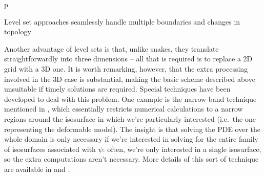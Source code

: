 \begin{stusubfig}{p}
	\\ \vspace{4mm}%
\caption{Level set approaches seamlessly handle multiple boundaries and changes in topology}
\label{fig:background-segmentation-levelsets-topologychanges}
\end{stusubfig}

Another advantage of level sets is that, unlike snakes, they translate straightforwardly into three dimensions -- all that is required is to replace a 2D grid with a 3D one. It is worth remarking, however, that the extra processing involved in the 3D case is substantial, making the basic scheme described above unsuitable if timely solutions are required. Special techniques have been developed to deal with this problem. One example is the narrow-band technique mentioned in \cite{malladi95}, which essentially restricts numerical calculations to a narrow regions around the isosurface in which we're particularly interested (i.e.~the one representing the deformable model). The insight is that solving the PDE over the whole domain is only necessary if we're interested in solving for the entire family of isosurfaces associated with $\psi$: often, we're only interested in a single isosurface, so the extra computations aren't necessary. More details of this sort of technique are available in \cite{malladi95} and \cite{itk}.

